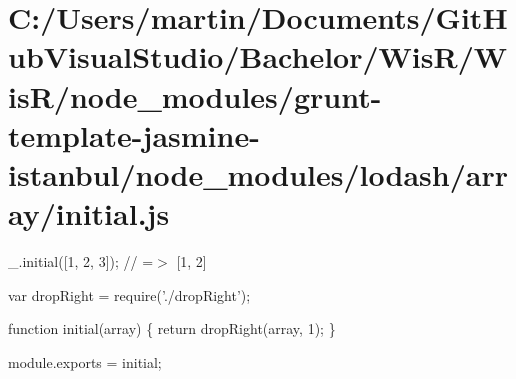 \hypertarget{_c_1_2_users_2martin_2_documents_2_git_hub_visual_studio_2_bachelor_2_wis_r_2_wis_r_2node_moduleab7a9eaec349afc15135ffb04e5a6745}{}\section{C\+:/\+Users/martin/\+Documents/\+Git\+Hub\+Visual\+Studio/\+Bachelor/\+Wis\+R/\+Wis\+R/node\+\_\+modules/grunt-\/template-\/jasmine-\/istanbul/node\+\_\+modules/lodash/array/initial.\+js}
\+\_\+.\+initial(\mbox{[}1, 2, 3\mbox{]}); // =$>$ \mbox{[}1, 2\mbox{]}


\begin{DoxyCodeInclude}
var dropRight = require(\textcolor{stringliteral}{'./dropRight'});

\textcolor{keyword}{function} initial(array) \{
  \textcolor{keywordflow}{return} dropRight(array, 1);
\}

module.exports = initial;
\end{DoxyCodeInclude}
 